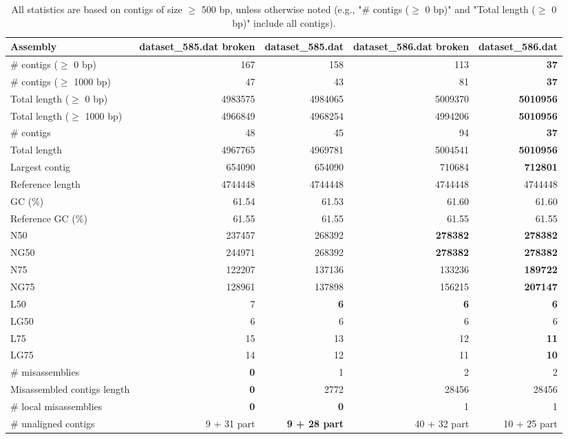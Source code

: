 \documentclass[12pt,a4paper]{article}
\begin{document}
\begin{table}[ht]
\begin{center}
\caption{All statistics are based on contigs of size $\geq$ 500 bp, unless otherwise noted (e.g., "\# contigs ($\geq$ 0 bp)" and "Total length ($\geq$ 0 bp)" include all contigs).}
\begin{tabular}{|l*{4}{|r}|}
\hline
Assembly & dataset\_585.dat broken & dataset\_585.dat & dataset\_586.dat broken & dataset\_586.dat \\ \hline
\# contigs ($\geq$ 0 bp) & 167 & 158 & 113 & {\bf 37} \\ \hline
\# contigs ($\geq$ 1000 bp) & 47 & 43 & 81 & {\bf 37} \\ \hline
Total length ($\geq$ 0 bp) & 4983575 & 4984065 & 5009370 & {\bf 5010956} \\ \hline
Total length ($\geq$ 1000 bp) & 4966849 & 4968254 & 4994206 & {\bf 5010956} \\ \hline
\# contigs & 48 & 45 & 94 & {\bf 37} \\ \hline
Total length & 4967765 & 4969781 & 5004541 & {\bf 5010956} \\ \hline
Largest contig & 654090 & 654090 & 710684 & {\bf 712801} \\ \hline
Reference length & 4744448 & 4744448 & 4744448 & 4744448 \\ \hline
GC (\%) & 61.54 & 61.53 & 61.60 & 61.60 \\ \hline
Reference GC (\%) & 61.55 & 61.55 & 61.55 & 61.55 \\ \hline
N50 & 237457 & 268392 & {\bf 278382} & {\bf 278382} \\ \hline
NG50 & 244971 & 268392 & {\bf 278382} & {\bf 278382} \\ \hline
N75 & 122207 & 137136 & 133236 & {\bf 189722} \\ \hline
NG75 & 128961 & 137898 & 156215 & {\bf 207147} \\ \hline
L50 & 7 & {\bf 6} & {\bf 6} & {\bf 6} \\ \hline
LG50 & 6 & 6 & 6 & 6 \\ \hline
L75 & 15 & 13 & 12 & {\bf 11} \\ \hline
LG75 & 14 & 12 & 11 & {\bf 10} \\ \hline
\# misassemblies & {\bf 0} & 1 & 2 & 2 \\ \hline
Misassembled contigs length & {\bf 0} & 2772 & 28456 & 28456 \\ \hline
\# local misassemblies & {\bf 0} & {\bf 0} & 1 & 1 \\ \hline
\# unaligned contigs & 9 + 31 part & {\bf 9 + 28 part} & 40 + 32 part & 10 + 25 part \\ \hline

\end{tabular}
\end{center}
\end{table}
\end{document}
